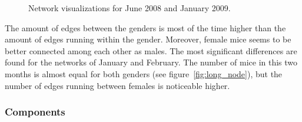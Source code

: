 \begin{figure}[htpb]%
	\centering 
	
	\qquad 			
	\caption[Network visualizations for June 2008 and January 2009]{Network visualizations for June 2008 and January 2009.}
	 \label{fig:june_jan_side}
\end{figure} 

The amount of edges between the genders is most of the time higher than the amount of edges running within the gender. Moreover, female mice seems to be better connected among each other as males. The most significant differences are found for the networks of January and February. The number of mice in this two months is almost equal for both genders (see figure~\ref{fig:long_node}), but the number of edges running between females is noticeable higher. 
      
\subsubsection{Components}


